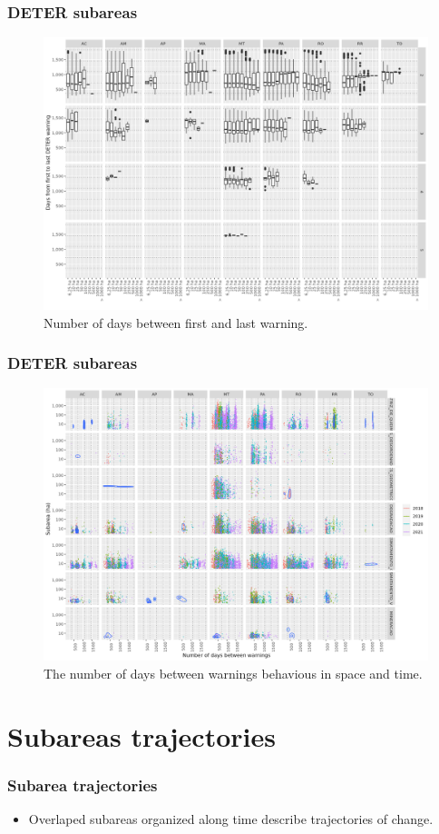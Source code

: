\documentclass[aspectratio=169]{beamer}
\begin{document}
\begin{frame}
    \frametitle{DETER subareas}
    \begin{figure}[h] 
        \includegraphics[width=0.7\linewidth]
        {./figures/plot_deter_days_first_to_last.png}
        \caption{Number of days between first and last warning.}
        \label{fig:deter_days_first_to_last}
    \end{figure}
\end{frame}

\begin{frame}
    \frametitle{DETER subareas}
    \begin{figure}[h] 
        \includegraphics[width=0.65\linewidth]
        {./figures/plot_deter_subarea_density_by_state_first-type_nwarnings.png}
        \caption{The number of days between warnings behavious in space and 
        time.}
        \label{fig:deter_subarea_density_state_first_type_nwarnings}
    \end{figure}
\end{frame}


\section{Subareas trajectories} 


\begin{frame}
    \frametitle{Subarea trajectories}
    \begin{itemize}
        \item Overlaped subareas organized along time describe trajectories of
            change.
    \end{itemize}
\end{frame}
\end{document}
